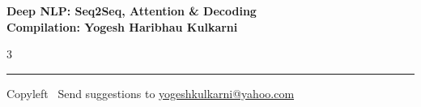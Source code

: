 \documentclass[8pt,landscape]{article}
\begin{document}
\footnotesize


\begin{center}
\Large{\textbf{Deep NLP: Seq2Seq, Attention \& Decoding\\ Compilation: Yogesh Haribhau Kulkarni}}
\end{center}

\begin{multicols}{3}

\end{multicols}

\rule{\linewidth}{0.25pt}
\scriptsize
Copyleft \textcopyleft\  Send suggestions to
\href{http://www.yogeshkulkarni.com}{yogeshkulkarni@yahoo.com}
\end{document}
